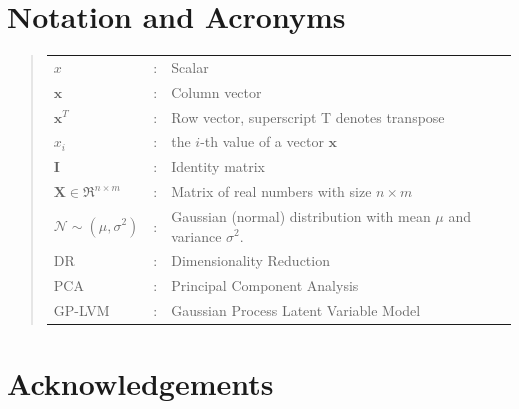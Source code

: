 \documentclass[ %
author={Dillon Keith Diep},
supervisor={Dr. Carl Henrik Ek},
degree={MEng},
title={ART-CG Hair:},
subtitle={Assisted Real-time Content Generation of Stylised Virtual Hair},
type={Research},
year={2017} ]{dissertation}
\begin{document}

\chapter*{Notation and Acronyms}

\begin{quote}
	\noindent
	\begin{tabular}{lcl}
		$x$                 &:	& Scalar\\
		$\bm{x}$            &:	& Column vector\\
		$\bm{x}^T$			&:	& Row vector, superscript T denotes transpose\\
		$x_i$               &:  & the $i$-th value of a vector $\bm{x}$\\
		$\bm{I}$ 			&:	& Identity matrix\\
		$\bm{X}\in \Re^{n \times m}$	&:	& Matrix of real numbers with size $n \times m$\\
		$\mathcal{N}\sim(\mu, \sigma^2)$ 			&:	& Gaussian (normal) distribution with mean $\mu$ and variance $\sigma^2$.\\
		DR					&:	& Dimensionality Reduction\\
		PCA		 			&:	& Principal Component Analysis\\
		GP-LVM	 			&:	& Gaussian Process Latent Variable Model\\
	\end{tabular}
\end{quote}


\chapter*{Acknowledgements}


\noindent


%
\end{document}
